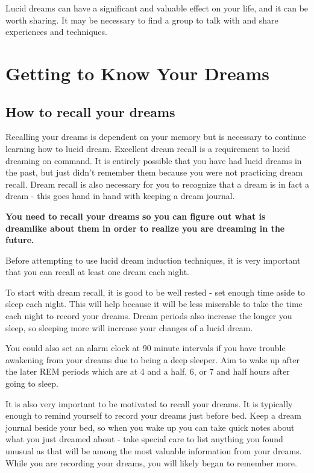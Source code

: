 \documentclass{report}
\begin{document}
Lucid dreams can have a significant and valuable effect on your life, and it can be worth sharing. It may be necessary to find a group to talk with and share experiences and techniques.

\section{Getting to Know Your Dreams}
\subsection{How to recall your dreams}
Recalling your dreams is dependent on your memory but is necessary to continue learning how to lucid dream. Excellent dream recall is a requirement to lucid dreaming on command. It is entirely possible that you have had lucid dreams in the past, but just didn't remember them because you were not practicing dream recall. Dream recall is also necessary for you to recognize that a dream is in fact a dream - this goes hand in hand with keeping a dream journal.

\textbf{You need to recall your dreams so you can figure out what is dreamlike about them in order to realize you are dreaming in the future.}

Before attempting to use lucid dream induction techniques, it is very important that you can recall at least one dream each night.

To start with dream recall, it is good to be well rested - set enough time aside to sleep each night. This will help because it will be less miserable to take the time each night to record your dreams. Dream periods also increase the longer you sleep, so sleeping more will increase your changes of a lucid dream.

You could also set an alarm clock at 90 minute intervals if you have trouble awakening from your dreams due to being a deep sleeper. Aim to wake up after the later REM periods which are at 4 and a half, 6, or 7 and half hours after going to sleep.

It is also very important to be motivated to recall your dreams. It is typically enough to remind yourself to record your dreams just before bed. Keep a dream journal beside your bed, so when you wake up you can take quick notes about what you just dreamed about - take special care to list anything you found unusual as that will be among the most valuable information from your dreams. While you are recording your dreams, you will likely began to remember more.
\end{document}
